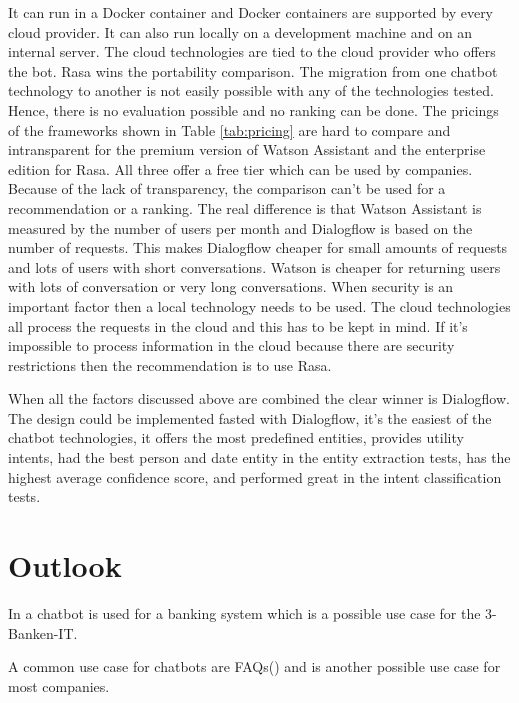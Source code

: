 It can run in a Docker container and Docker containers are supported by every 
cloud provider.
It can also run locally on a development machine and on an internal server.
The cloud technologies are tied to the cloud provider who offers the bot.
Rasa wins the portability comparison.
The migration from one chatbot technology to another is not easily possible with 
any of the technologies tested. 
Hence, there is no evaluation possible and no ranking can be done.
The pricings of the frameworks shown in Table \ref{tab:pricing} are hard to compare and intransparent for the premium version of Watson Assistant and the enterprise edition for Rasa.
All three offer a free tier which can be used by companies.
Because of the lack of transparency, the comparison can't be used for a recommendation or a ranking.
The real difference is that Watson Assistant is measured by the number of users per month and 
Dialogflow is based on the number of requests.
This makes Dialogflow cheaper for small amounts of requests and lots of users with short conversations.
Watson is cheaper for returning users with lots of conversation or very long conversations.
When security is an important factor then a local technology needs to be used.
The cloud technologies all process the requests in the cloud and this has to be 
kept in mind.
If it's impossible to process information in the cloud because there are security restrictions
then the recommendation is to use Rasa.

When all the factors discussed above are combined the clear winner is Dialogflow.
The design could be implemented fasted with Dialogflow, it's the easiest of the chatbot technologies,
it offers the most predefined entities, provides utility intents, had the best person and date
entity in the entity extraction tests, has the highest average confidence score, 
and performed great in the intent classification tests. 



\section{Outlook}
In \citet{singhbuilding} a chatbot is used for a banking system which is a possible use case for the 3-Banken-IT.

A common use case for chatbots are FAQs(\citet{evaluateChatbotsShawar2007, buiildChatbotsPython, huang2007extracting, GO2019304}) 
and is another possible use case for most companies.


